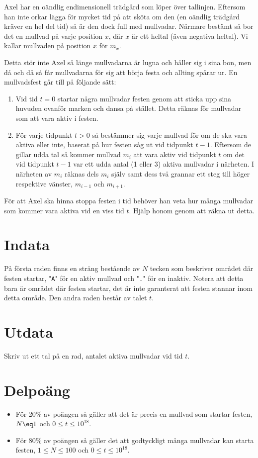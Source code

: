 
Axel har en oändlig endimensionell trädgård som löper över tallinjen. Eftersom han inte orkar lägga för mycket tid på att sköta om den (en oändlig trädgård kräver en hel del tid) så är den dock full med mullvadar. Närmare bestämt så bor det en mullvad på varje position $x$, där $x$ är ett heltal (även negativa heltal). Vi kallar mullvaden på position $x$ för $m_x$.

Detta stör inte Axel så länge mullvadarna är lugna och håller sig i sina bon, men då och då så får mullvadarna för sig att börja festa och allting spårar ur. En mullvadsfest går till på följande sätt:
\begin{enumerate}
\item Vid tid $t=0$ startar några mullvadar festen genom att sticka upp sina huvuden ovanför marken och dansa på stället. Detta räknas för mullvadar som att vara aktiv i festen.
\item För varje tidpunkt $t > 0$ så bestämmer sig varje mullvad för om de ska vara aktiva eller inte, baserat på hur festen såg ut vid tidpunkt $t-1$. Eftersom de gillar udda tal så kommer mullvad $m_i$ att vara aktiv vid tidpunkt $t$ om det vid tidpunkt $t-1$ var ett udda antal (1 eller 3) aktiva mullvadar i närheten. I närheten av $m_i$ räknas dels $m_i$ själv samt dess två grannar ett steg till höger respektive vänster, $m_{i-1}$ och $m_{i+1}$.
\end{enumerate}

För att Axel ska hinna stoppa festen i tid behöver han veta hur många mullvadar som kommer vara aktiva vid en viss tid $t$. Hjälp honom genom att räkna ut detta.

\section*{Indata}
På första raden finns en sträng bestående av $N$ tecken som beskriver området där festen startar, "\texttt{A}" för en aktiv mullvad och "\texttt{.}" för en inaktiv. Notera att detta bara är området där festen startar, det är inte garanterat att festen stannar inom detta område. Den andra raden består av talet $t$.

\section*{Utdata}
Skriv ut ett tal på en rad, antalet aktiva mullvadar vid tid $t$.

\section*{Delpoäng}
\begin{itemize}
\item För 20\% av poängen så gäller att det är precis en mullvad som startar festen, $N \eq 1$ och $0 \leq t \leq 10^{18}$.
\item För 80\% av poängen så gäller det att godtyckligt många mullvadar kan starta festen, $1 \leq N \leq 100$ och $0 \leq t \leq 10^{18}$.
\end{itemize}

